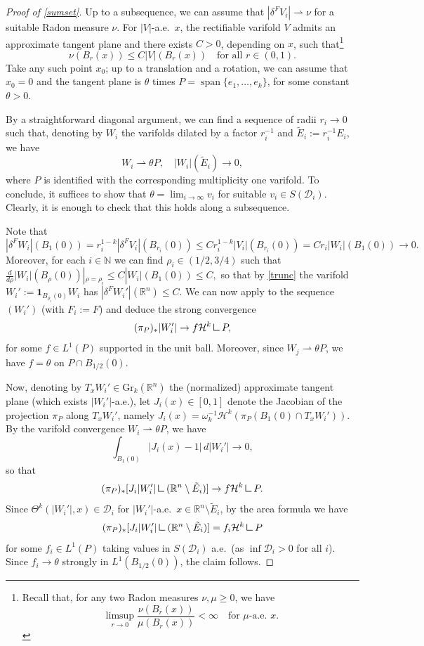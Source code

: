 \documentclass[11pt,a4paper]{amsart}
\newcommand{\N}{\mathbb{N}}
\newcommand{\R}{\mathbb{R}}
\newcommand{\uno}{\bm{1}}
\newcommand{\mrestr}{\mathbin{\vrule height 1.6ex depth 0pt width
0.13ex\vrule height 0.13ex depth 0pt width 1.3ex}}
\theoremstyle{definition}
\newcommand{\weakto}{\rightharpoonup}
\newcommand{\gr}{\text{Gr}_k(\R^n)}
\begin{document}
\begin{proof}[Proof of \cref{sumset}]
    Up to a subsequence, we can assume that $|\delta^FV_i|\weakto\nu$ for a suitable Radon measure $\nu$.
    For $|V|$-a.e.\ $x$, the rectifiable varifold $V$ admits an approximate tangent plane
    and there exists $C>0$, depending on $x$, such that\footnote{Recall that, for any two Radon measures \(\nu,\mu\ge0\), we have \[\limsup_{r \to 0} \frac{
    \nu(B_r(x))}{\mu(B_r(x))}<\infty
    \quad \text{for \(\mu\)-a.e.\ \(x\).}\]}
    $$\nu(B_r(x))\le C|V|(B_r(x))\quad\text{for all }r\in(0,1).$$
    Take any such point $x_0$; up to a translation and a rotation, we can assume that
    $x_0=0$ and the tangent plane is $\theta$ times $P=\operatorname{span}\{e_1,\dots,e_k\}$,
    for some constant $\theta>0$.

    By a straightforward diagonal argument, we can find a sequence of radii $r_i\to0$
    such that, denoting by $W_i$ the varifolds dilated by a factor $r_i^{-1}$ and $\tilde E_i:=r_i^{-1}E_i$, we have
    $$W_i\weakto\theta P,\quad |W_i|(\tilde E_i)\to0,$$
    where $P$ is identified with the corresponding multiplicity one varifold.
    To conclude, it suffices to show that $\theta=\lim_{i\to\infty}v_i$ for suitable $v_i\in S(\mathcal{D}_i)$.
    Clearly, it is enough to check that this holds along a subsequence.
    
    Note that
    \begin{equation}\label{resc.f.v}|\delta^FW_i|(B_1(0))=r_i^{1-k}|\delta^FV_i|(B_{r_i}(0))\le Cr_i^{1-k}|V_i|(B_{r_i}(0))
    =Cr_i|W_i|(B_1(0))\to0.\end{equation}
    Moreover, for each $i\in\N$ we can find $\rho_i\in(1/2,3/4)$ such that
    $\frac{d}{d\rho}|W_i|(B_\rho(0))|_{\rho=\rho_i}\le C|W_i|(B_1(0))\le C,$
    so that by \cref{trunc} the varifold $W_i':=\uno_{B_{\rho_i}(0)}W_i$ has $|\delta^FW_i'|(\R^n)\le C$.
    We can now apply \cite[Lemma 3.2]{DDG} to the sequence $(W_i')$ (with $F_i:=F$) and deduce the
    strong convergence
    $$(\pi_P)_*|W_i'|\to f\mathcal{H}^k\mrestr P,$$
    for some $f\in L^1(P)$ supported in the unit ball. Moreover, since $W_j\weakto\theta P$, we have
    $f=\theta$ on $P\cap B_{1/2}(0)$.
    
    Now, denoting by $T_xW_i'\in\gr$ the (normalized) approximate tangent plane (which exists $|W_i'|$-a.e.),
    let $J_i(x)\in[0,1]$ denote the Jacobian of the projection $\pi_P$ along $T_xW_i'$, namely
    $J_i(x)=\omega_k^{-1}\mathcal{H}^k(\pi_P(B_1(0)\cap T_xW_i'))$.
    By the varifold convergence $W_i\weakto\theta P$, we have
    $$\int_{B_1(0)}|J_i(x)-1|\,d|W_i'|\to0,$$
    so that
    $$(\pi_P)_*[J_i|W_i'|\mrestr(\R^n\setminus\tilde E_i)]\to f\mathcal{H}^k\mrestr P.$$
    Since $\Theta^k(|W_i'|,x)\in\mathcal{D}_i$ for $|W_i'|$-a.e.\ $x\in\R^n\setminus\tilde E_i$,
    by the area formula we have
    $$(\pi_P)_*[J_i|W_i'|\mrestr(\R^n\setminus\tilde E_i)]=f_i\mathcal{H}^k\mrestr P$$
    for some $f_i\in L^1(P)$ taking values in $S(\mathcal{D}_i)$ a.e.\ (as $\inf\mathcal{D}_i>0$ for all $i$).
    Since $f_i\to\theta$ strongly in $L^1(B_{1/2}(0))$, the claim follows.
\end{proof}
\end{document}

